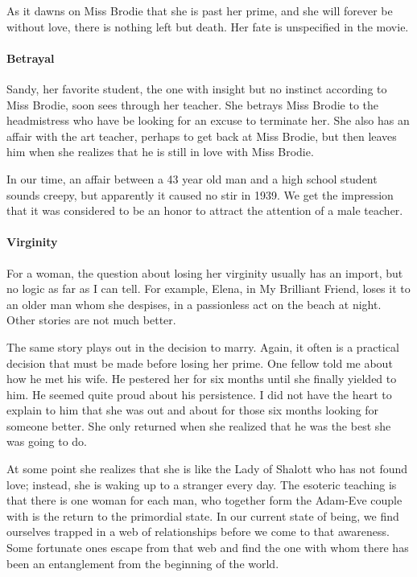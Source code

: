 As it dawns on Miss Brodie that she is past her prime, and she will forever be without love, there is nothing left but death. Her fate is unspecified in the movie.

\paragraph{Betrayal}
Sandy, her favorite student, the one with insight but no instinct according to Miss Brodie, soon sees through her teacher. She betrays Miss Brodie to the headmistress who have be looking for an excuse to terminate her. She also has an affair with the art teacher, perhaps to get back at Miss Brodie, but then leaves him when she realizes that he is still in love with Miss Brodie.

In our time, an affair between a 43 year old man and a high school student sounds creepy, but apparently it caused no stir in 1939. We get the impression that it was considered to be an honor to attract the attention of a male teacher.

\paragraph{Virginity}
For a woman, the question about losing her virginity usually has an import, but no logic as far as I can tell. For example, Elena, in My Brilliant Friend, loses it to an older man whom she despises, in a passionless act on the beach at night. Other stories are not much better.

The same story plays out in the decision to marry. Again, it often is a practical decision that must be made before losing her prime. One fellow told me about how he met his wife. He pestered her for six months until she finally yielded to him. He seemed quite proud about his persistence. I did not have the heart to explain to him that she was out and about for those six months looking for someone better. She only returned when she realized that he was the best she was going to do.

At some point she realizes that she is like the Lady of Shalott who has not found love; instead, she is waking up to a stranger every day. The esoteric teaching is that there is one woman for each man, who together form the Adam-Eve couple with is the return to the primordial state. In our current state of being, we find ourselves trapped in a web of relationships before we come to that awareness. Some fortunate ones escape from that web and find the one with whom there has been an entanglement from the beginning of the world.

